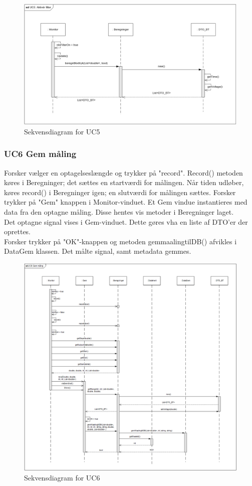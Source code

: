 \begin{figure}[H]
	\centering
	\includegraphics[width=1\textwidth]{Figurer/UC5_SD_SW}
	\caption{Sekvensdiagram for UC5}
\end{figure}

\subsubsection{UC6 Gem måling}
Forsker vælger en optagelseslængde og trykker på "record". Record() metoden køres i Beregninger; det sættes en startværdi for målingen.
Når tiden udløber, køres record() i Beregninger igen; en slutværdi for målingen sættes.
Forsker trykker på "Gem" knappen i Monitor-vinduet. Et Gem vindue instantieres med data fra den optagne måling. Disse hentes vis metoder i Beregninger laget.\\
Det optagne signal vises i Gem-vinduet. Dette gøres vha en liste af DTO'er der oprettes.\\

Forsker trykker på "OK"\--knappen
og metoden gemmaalingtilDB() afvikles i DataGem klassen. Det målte signal, samt metadata gemmes. 

\begin{figure}[H]
	\centering
	\includegraphics[width=1\textwidth]{Figurer/UC6_SD_SW}
	\caption{Sekvensdiagram for UC6}
\end{figure}

